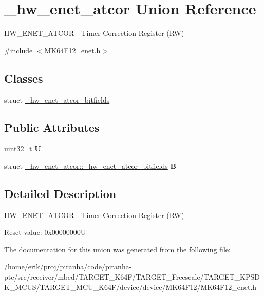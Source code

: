\hypertarget{union__hw__enet__atcor}{}\section{\+\_\+hw\+\_\+enet\+\_\+atcor Union Reference}
\label{union__hw__enet__atcor}


H\+W\+\_\+\+E\+N\+E\+T\+\_\+\+A\+T\+C\+OR -\/ Timer Correction Register (RW)  




{\ttfamily \#include $<$M\+K64\+F12\+\_\+enet.\+h$>$}

\subsection*{Classes}
\begin{DoxyCompactItemize}
\item 
struct \hyperlink{struct__hw__enet__atcor_1_1__hw__enet__atcor__bitfields}{\+\_\+hw\+\_\+enet\+\_\+atcor\+\_\+bitfields}
\end{DoxyCompactItemize}
\subsection*{Public Attributes}
\begin{DoxyCompactItemize}
\item 
uint32\+\_\+t {\bfseries U}\hypertarget{union__hw__enet__atcor_af9f97b50ad2a7f43425f204d69d6e1f7}{}\label{union__hw__enet__atcor_af9f97b50ad2a7f43425f204d69d6e1f7}

\item 
struct \hyperlink{struct__hw__enet__atcor_1_1__hw__enet__atcor__bitfields}{\+\_\+hw\+\_\+enet\+\_\+atcor\+::\+\_\+hw\+\_\+enet\+\_\+atcor\+\_\+bitfields} {\bfseries B}\hypertarget{union__hw__enet__atcor_a6aa0c7d2e7c965f9a8851c91c10f5906}{}\label{union__hw__enet__atcor_a6aa0c7d2e7c965f9a8851c91c10f5906}

\end{DoxyCompactItemize}


\subsection{Detailed Description}
H\+W\+\_\+\+E\+N\+E\+T\+\_\+\+A\+T\+C\+OR -\/ Timer Correction Register (RW) 

Reset value\+: 0x00000000U 

The documentation for this union was generated from the following file\+:\begin{DoxyCompactItemize}
\item 
/home/erik/proj/piranha/code/piranha-\/ptc/src/receiver/mbed/\+T\+A\+R\+G\+E\+T\+\_\+\+K64\+F/\+T\+A\+R\+G\+E\+T\+\_\+\+Freescale/\+T\+A\+R\+G\+E\+T\+\_\+\+K\+P\+S\+D\+K\+\_\+\+M\+C\+U\+S/\+T\+A\+R\+G\+E\+T\+\_\+\+M\+C\+U\+\_\+\+K64\+F/device/device/\+M\+K64\+F12/M\+K64\+F12\+\_\+enet.\+h\end{DoxyCompactItemize}

